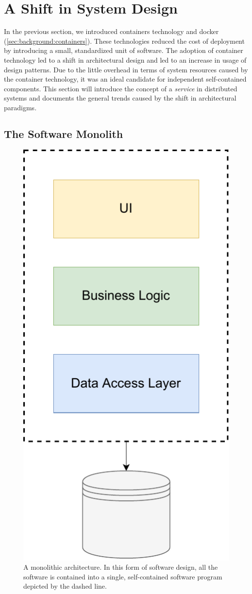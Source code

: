 \section{A Shift in System Design}
\label{sec:background:soa}

In the previous section, we introduced \glspl{container} technology and \Gls{docker} (\cref{sec:background:containers}). These technologies reduced the cost of deployment by introducing a small, standardized unit of software. The adoption of container technology led to a shift in architectural design and led to an increase in usage of  design patterns. Due to the little overhead in terms of system resources caused by the \gls{container} technology, it was an ideal candidate for independent self-contained components. This section will introduce the concept of a \textit{service} in distributed systems and documents the general trends caused by the shift in architectural paradigms.

\subsection{The Software Monolith}
\begin{figure}[!t]
    \centering
    
    \includegraphics[width=0.3\linewidth]{2_background/figures/monolith-architecture.pdf}

    \caption{A monolithic architecture. In this form of software design, all the software is contained into a single, self-contained software program depicted by the dashed line. }
    \label{fig:monolithic-architecture}
\end{figure}


